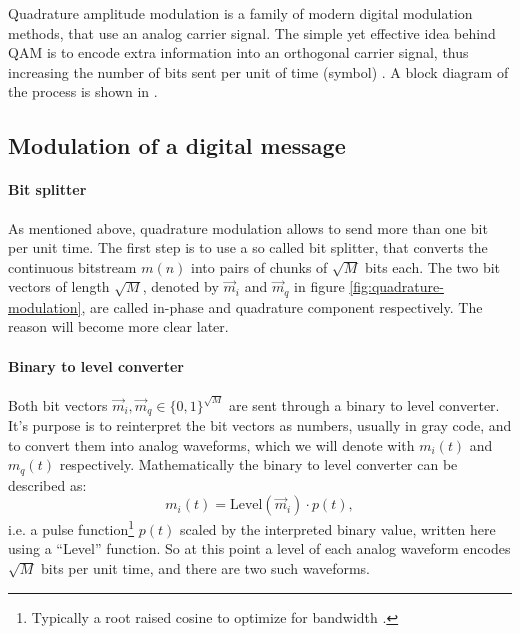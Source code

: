 Quadrature amplitude modulation is a family of modern digital modulation methods, that use an analog carrier signal. The simple yet effective idea behind QAM is to encode extra information into an orthogonal carrier signal, thus increasing the number of bits sent per unit of time (symbol) \cite{Gallager,Kneubuehler,Mathis,Hsu}. A block diagram of the process is shown in .


\subsection{Modulation of a digital message}

\paragraph{Bit splitter}

As mentioned above, quadrature modulation allows to send more than one bit per unit time. The first step is to use a so called bit splitter, that converts the continuous bitstream \(m(n)\) into pairs of chunks of \(\sqrt{M}\) bits each. The two bit vectors of length \(\sqrt{M}\), denoted by \(\vec{m}_i\) and \(\vec{m}_q\) in figure \ref{fig:quadrature-modulation}, are called in-phase and quadrature component respectively\cite{Hsu}. The reason will become more clear later.

\paragraph{Binary to level converter}


Both bit vectors \(\vec{m}_i, \vec{m}_q \in \{0,1\}^{\sqrt{M}}\) are sent through a binary to level converter. It's purpose is to reinterpret the bit vectors as numbers, usually in gray code, and to convert them into analog waveforms, which we will denote with \(m_i(t)\) and \(m_q(t)\) respectively. Mathematically the binary to level converter can be described as:
\begin{equation}
	m_i(t) = \text{Level}(\vec{m}_i) \cdot p(t),
\end{equation}
i.e. a pulse function\footnote{Typically a root raised cosine to optimize for bandwidth \cite{Hsu}.} \(p(t)\) scaled by the interpreted binary value, written here using a ``Level'' function. So at this point a level of each analog waveform encodes \(\sqrt{M}\) bits per unit time, and there are two such waveforms.



